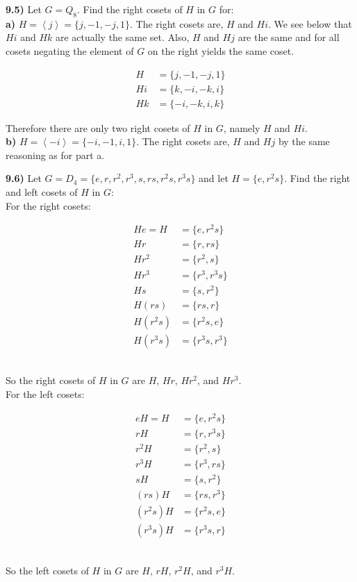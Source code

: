 \documentclass{scrartcl}
\begin{document}
\textbf{9.5)} Let $G=Q_8$. Find the right cosets of $H$ in $G$ for:\\

\textbf{a)} $H=\left<j\right>=\{j,-1,-j,1\}$. The right cosets are, $H$ and $Hi$. We see below that $Hi$ and $Hk$ are actually the same set. Also, $H$ and $Hj$ are the same and for all cosets negating the element of $G$ on the right yields the same coset.
\begin{center}
\begin{align*}
H &= \{j,-1,-j,1\}\\
Hi &= \{k,-i,-k,i\}\\
Hk &= \{-i,-k,i,k\}
\end{align*}
\end{center}
Therefore there are only two right cosets of $H$ in $G$, namely $H$ and $Hi$.\\

\textbf{b)} $H=\left<-i\right>=\{-i,-1,i,1\}$. The right cosets are, $H$ and $Hj$ by the same reasoning as for part a.\pagebreak

\textbf{9.6)} Let $G=D_4=\{e,r,r^2,r^3,s,rs,r^2s,r^3s\}$ and let $H=\{e,r^2s\}$. Find the right and left cosets of $H$ in $G$:\\
For the right cosets:\\
\begin{center}
\begin{align*}
He = H &= \{e,r^2s\}\\
Hr &= \{r, rs\}\\
Hr^2 &= \{r^2, s\}\\
Hr^3 &= \{r^3, r^3s\}\\
Hs &= \{s, r^2\}\\
H(rs) &= \{rs, r\}\\
H(r^2s) &= \{r^2s, e\}\\
H(r^3s) &= \{r^3s, r^3\}
\end{align*}\\
\end{center}
So the right cosets of $H$ in $G$ are $H$, $Hr$, $Hr^2$, and $Hr^3$.\\
For the left cosets:
\begin{center}
\begin{align*}
eH = H &= \{e,r^2s\}\\
rH &= \{r, r^3s\}\\
r^2H &= \{r^2, s\}\\
r^3H &= \{r^3, rs\}\\
sH &= \{s, r^2\}\\
(rs)H &= \{rs, r^3\}\\
(r^2s)H &= \{r^2s, e\}\\
(r^3s)H &= \{r^3s, r\}
\end{align*}\\
\end{center}
So the left cosets of $H$ in $G$ are $H$, $rH$, $r^2H$, and $r^3H$.\pagebreak
\end{document}
